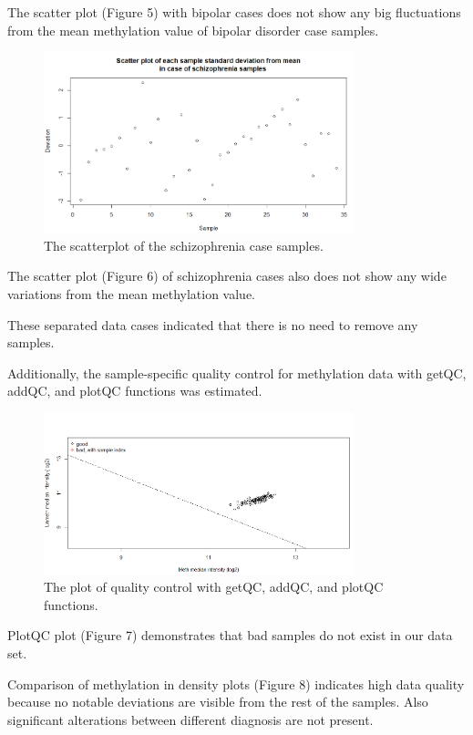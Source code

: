 \documentclass[
]{article}
\begin{document}
The scatter plot (Figure 5) with bipolar cases does not show any big
fluctuations from the mean methylation value of bipolar disorder case
samples.

\begin{figure}[!h]
  \begin{center}
    \includegraphics[width=90mm]{./10.png}
    \caption{
      The scatterplot of the schizophrenia case samples.
    }
  \end{center}
\end{figure}

The scatter plot (Figure 6) of schizophrenia cases also does not show
any wide variations from the mean methylation value.

These separated data cases indicated that there is no need to remove any
samples.

Additionally, the sample-specific quality control for methylation data
with getQC, addQC, and plotQC functions was estimated.

\begin{figure}[!h]
  \begin{center}
    \includegraphics[width=90mm]{./11.png}
    \caption{
      The plot of quality control with getQC, addQC, and plotQC functions.
    }
  \end{center}
\end{figure}

PlotQC plot (Figure 7) demonstrates that bad samples do not exist in our
data set.

Comparison of methylation in density plots (Figure 8) indicates high
data quality because no notable deviations are visible from the rest of
the samples. Also significant alterations between different diagnosis
are not present.
\end{document}
